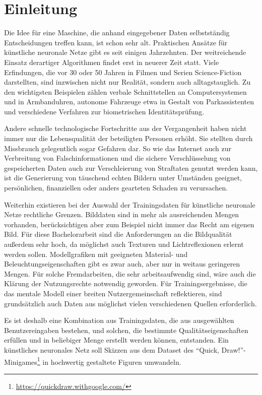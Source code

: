 \chapter{Einleitung}
\label{ch:einleitung}
Die Idee für eine Maschine, die anhand eingegebener Daten selbstständig Entscheidungen treffen kann, ist schon sehr alt. Praktischen Ansätze für künstliche neuronale Netze gibt es seit einigen Jahrzehnten. Der weitreichende Einsatz derartiger Algorithmen findet erst in neuerer Zeit statt. Viele Erfindungen, die vor 30 oder 50 Jahren in Filmen und Serien Science-Fiction darstellten, sind inzwischen nicht nur Realität, sondern auch alltagstauglich. Zu den wichtigsten Beispielen zählen verbale Schnittstellen an Computersystemen und in Armbanduhren, autonome Fahrzeuge etwa in Gestalt von Parkassistenten und verschiedene Verfahren zur biometrischen Identitätsprüfung.

Andere schnelle technologische Fortschritte aus der Vergangenheit haben nicht immer nur die Lebensqualität der beteiligten Personen erhöht. Sie stellten durch Missbrauch gelegentlich sogar Gefahren dar. So wie das Internet auch zur Verbreitung von Falschinformationen und die sichere Verschlüsselung von gespeicherten Daten auch zur Verschleierung von Straftaten genutzt werden kann, ist die Generierung von täuschend echten Bildern unter Umständen geeignet, persönlichen, finanziellen oder anders gearteten Schaden zu verursachen.

Weiterhin existieren bei der Auswahl der Trainingsdaten für künstliche neuronale Netze rechtliche Grenzen. Bilddaten sind in mehr als ausreichenden Mengen vorhanden, berücksichtigen aber zum Beispiel nicht immer das Recht am eigenen Bild. Für diese Bachelorarbeit sind die Anforderungen an die Bildqualität außerdem sehr hoch, da möglichst auch Texturen und Lichtreflexionen erlernt werden sollen. Modellgrafiken mit geeigneten Material- und Beleuchtungseigenschaften gibt es zwar auch, aber nur in weitaus geringeren Mengen. Für solche Fremdarbeiten, die sehr arbeitsaufwendig sind, wäre auch die Klärung der Nutzungsrechte notwendig geworden. Für Trainingsergebnisse, die das mentale Modell einer breiten Nutzergemeinschaft reflektieren, sind grundsätzlich auch Daten aus möglichst vielen verschiedenen Quellen erforderlich.

Es ist deshalb eine Kombination aus Trainingsdaten, die aus ausgewählten Benutzereingaben bestehen, und solchen, die bestimmte Qualitätseigenschaften erfüllen und in beliebiger Menge erstellt werden können, entstanden. Ein künstliches neuronales Netz soll Skizzen aus dem Dataset des ``Quick, Draw!''-Minigames\footnote{\href{https://quickdraw.withgoogle.com/}{https://quickdraw.withgoogle.com/}} in hochwertig gestaltete Figuren umwandeln.

